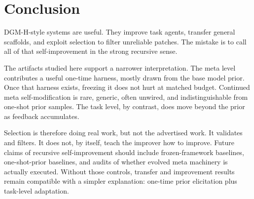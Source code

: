 \documentclass[11pt]{article}
\begin{document}
\section{Conclusion}\label{conclusion}

DGM-H-style systems are useful. They improve task agents, transfer general scaffolds, and exploit selection to filter unreliable patches. The mistake is to call all of that self-improvement in the strong recursive sense.

The artifacts studied here support a narrower interpretation. The meta level contributes a useful one-time harness, mostly drawn from the base model prior. Once that harness exists, freezing it does not hurt at matched budget. Continued meta self-modification is rare, generic, often unwired, and indistinguishable from one-shot prior samples. The task level, by contrast, does move beyond the prior as feedback accumulates.

Selection is therefore doing real work, but not the advertised work. It validates and filters. It does not, by itself, teach the improver how to improve. Future claims of recursive self-improvement should include frozen-framework baselines, one-shot-prior baselines, and audits of whether evolved meta machinery is actually executed. Without those controls, transfer and improvement results remain compatible with a simpler explanation: one-time prior elicitation plus task-level adaptation.
\end{document}
